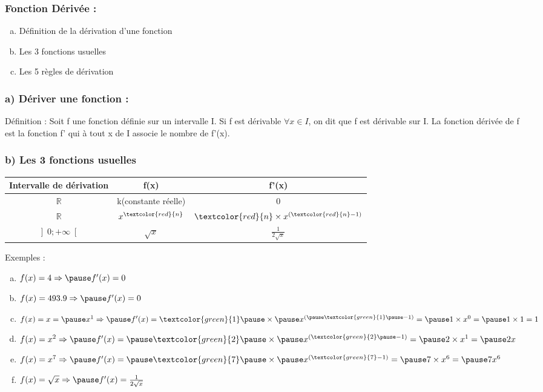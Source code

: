 \documentclass[t]{beamer}
\begin{document}
	\begin{frame}[label=pagebanale]
		\frametitle{Fonction Dérivée :}
		\pause
		\begin{enumerate}[a)]
			\item<+-> Définition de la dérivation d'une fonction
			\item<+-> Les 3 fonctions usuelles
			\item<+-> Les 5 règles de dérivation
		\end{enumerate}
	\end{frame}

	\begin{frame}[label=pagebanale]
		\frametitle{a) Dériver une fonction : }
		\pause
		\begin{block}{Définition :}
		\pause
		Soit f une fonction définie sur un intervalle I. \pause Si f est dérivable $\forall x \in I$, \pause on dit que f est dérivable sur I. \pause La fonction dérivée de f est la fonction f' qui à tout x de I \pause associe le nombre de f'(x).
		\pause
		\end{block}
	\end{frame}

	\begin{frame}[label=pagebanale]
		\frametitle{b) Les 3 fonctions usuelles}
		\pause
		\begin{tabular}{|c|c|c|}
			\hline
				\textbf{Intervalle de dérivation} & \textbf{f(x)} & \textbf{f'(x)} \\
			\hline
				$\mathbb{R}$ & k(constante réelle) & 0 \\
			\hline
				$\mathbb{R}$ & $x^{\textcolor{red}{n}}$ & $\textcolor{red}{n} \times x^{(\textcolor{red}{n}-1)} $ \\
			\hline
				$\left] 0;+ \infty \right[ $ & $\sqrt{x}$ & $\frac{1}{2 \sqrt{x}}$ \\
			\hline 
		\end{tabular}
		\pause
		\begin{block}{Exemples : }
			\pause
			\begin{enumerate}[a)]
				\item $ f(x)=4 \Rightarrow \pause f'(x)= 0 $
				\pause
				\item $ f(x)=493.9 \Rightarrow \pause f'(x)= 0 $
				\pause
				\item $ f(x)=x = \pause x^1 \Rightarrow \pause f'(x)= \textcolor{green}{1} \pause \times \pause x^{(\pause \textcolor{green}{1} \pause-1)} = \pause 1 \times x^0 = \pause 1 \times 1 = 1 $
				\pause
				\item $ f(x)=x^2 \Rightarrow \pause f'(x)= \pause \textcolor{green}{2} \pause \times \pause x^{(\textcolor{green}{2} \pause -1)} = \pause 2 \times x^1 = \pause 2x $
				\pause
				\item $ f(x)=x^7 \Rightarrow \pause f'(x)= \pause \textcolor{green}{7} \pause \times \pause x^{(\textcolor{green}{7}-1)} = \pause 7 \times x^6 = \pause 7x^6 $
				\pause
				\item $ f(x)=\sqrt{x} \Rightarrow \pause f'(x)= \frac{1}{2 \sqrt{x}}  $
				\pause
			\end{enumerate}
		\end{block}
	\end{frame}
\end{document}
